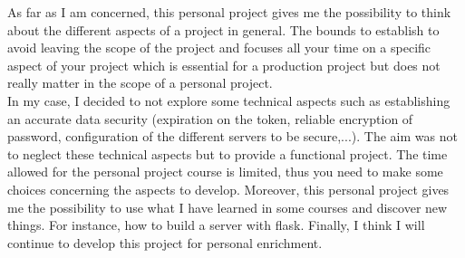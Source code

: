 As far as I am concerned, this personal project gives me the possibility to think about the different aspects of a project in general. The bounds to establish to avoid leaving the scope of the project and focuses all your time on a specific aspect of your project which is essential for a production project but does not really matter in the scope of a personal project.\\

In my case, I decided to not explore some technical aspects such as establishing an accurate data security (expiration on the token, reliable encryption of password, configuration of the different servers to be secure,...). The aim was not to neglect these technical aspects but to provide a functional project. The time allowed for the personal project course is limited, thus you need to make some choices concerning the aspects to develop. Moreover, this personal project gives me the possibility to use what I have learned in some courses and discover new things. For instance, how to build a server with flask. Finally, I think I will continue to develop this project for personal enrichment.